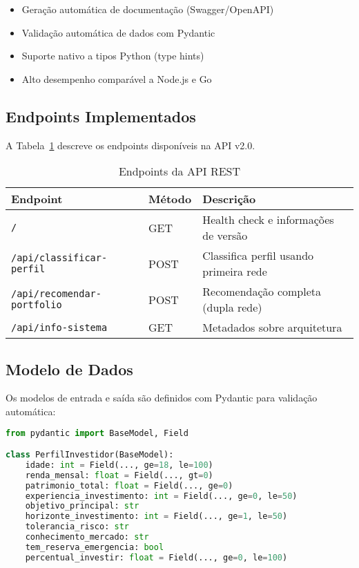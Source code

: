 \begin{itemize}
    \item Geração automática de documentação (Swagger/OpenAPI)
    \item Validação automática de dados com Pydantic
    \item Suporte nativo a tipos Python (type hints)
    \item Alto desempenho comparável a Node.js e Go \cite{fastapi2024benchmark}
\end{itemize}

\subsection{Endpoints Implementados}

A Tabela~\ref{tab:endpoints_api} descreve os endpoints disponíveis na API v2.0.

\begin{table}[htbp]
\centering
\caption{Endpoints da API REST}
\label{tab:endpoints_api}
\begin{tabular}{@{}llp{6cm}@{}}
\toprule
\textbf{Endpoint} & \textbf{Método} & \textbf{Descrição} \\ \midrule
\texttt{/} & GET & Health check e informações de versão \\
\texttt{/api/classificar-perfil} & POST & Classifica perfil usando primeira rede \\
\texttt{/api/recomendar-portfolio} & POST & Recomendação completa (dupla rede) \\
\texttt{/api/info-sistema} & GET & Metadados sobre arquitetura \\ \bottomrule
\end{tabular}
\end{table}

\subsection{Modelo de Dados}

Os modelos de entrada e saída são definidos com Pydantic para validação automática:

\begin{lstlisting}[language=Python, caption=Modelo de entrada da API, label=lst:pydantic]
from pydantic import BaseModel, Field

class PerfilInvestidor(BaseModel):
    idade: int = Field(..., ge=18, le=100)
    renda_mensal: float = Field(..., gt=0)
    patrimonio_total: float = Field(..., ge=0)
    experiencia_investimento: int = Field(..., ge=0, le=50)
    objetivo_principal: str
    horizonte_investimento: int = Field(..., ge=1, le=50)
    tolerancia_risco: str
    conhecimento_mercado: str
    tem_reserva_emergencia: bool
    percentual_investir: float = Field(..., ge=0, le=100)
\end{lstlisting}

